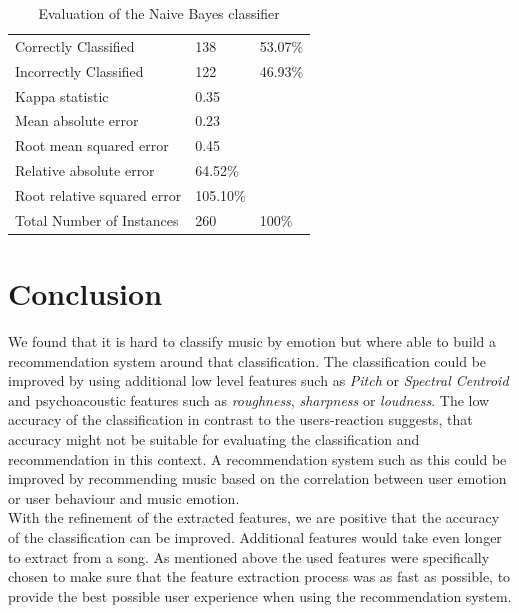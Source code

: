 \documentclass{sigchi-ext}
\begin{document}
\begin{table}
  \centering
  \begin{tabular}{@{}lll@{}}
    Correctly Classified          & 138       & 53.07\% \\
    Incorrectly Classified        & 122       & 46.93\% \\
    Kappa statistic               & 0.35      & \\
    Mean absolute error           & 0.23      & \\
    Root mean squared error       & 0.45      & \\
    Relative absolute error       & 64.52\%   & \\
    Root relative squared error   & 105.10\%  & \\
    Total Number of Instances     & 260       & 100\%
  \end{tabular}
  \caption{Evaluation of the Naive Bayes classifier}
\end{table}

\section{Conclusion}
We found that it is hard to classify music by emotion but where able to build a recommendation system around that classification. The classification could be improved by using additional low level features such as \textit{Pitch} or \textit{Spectral Centroid} and psychoacoustic features such as \textit{roughness}, \textit{sharpness} or \textit{loudness}. The low accuracy of the classification in contrast to the users-reaction suggests, that accuracy might not be suitable for evaluating the classification and recommendation in this context. A recommendation system such as this could be improved by recommending music based on the correlation between user emotion or user behaviour and music emotion.\\
With the refinement of the extracted features, we are positive that the accuracy of the classification can be improved. Additional features would take even longer to extract from a song. As mentioned above the used features were specifically chosen to make sure that the feature extraction process was as fast as possible, to provide the best possible user experience when using the recommendation system.



\end{document}
